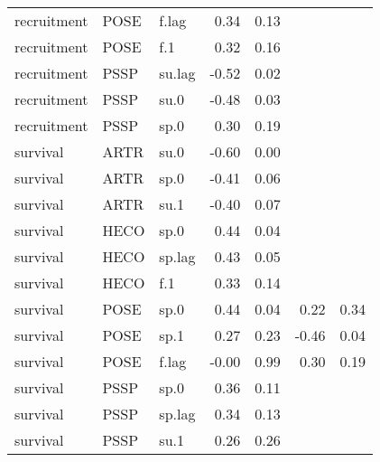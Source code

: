 \begin{table}[ht]
\begin{tabular}{lllrrrr}
  recruitment & POSE & f.lag & 0.34 & 0.13 &  &  \\ 
  recruitment & POSE & f.1 & 0.32 & 0.16 &  &  \\ 
  recruitment & PSSP & su.lag & -0.52 & 0.02 &  &  \\ 
  recruitment & PSSP & su.0 & -0.48 & 0.03 &  &  \\ 
  recruitment & PSSP & sp.0 & 0.30 & 0.19 &  &  \\ 
  survival & ARTR & su.0 & -0.60 & 0.00 &  &  \\ 
  survival & ARTR & sp.0 & -0.41 & 0.06 &  &  \\ 
  survival & ARTR & su.1 & -0.40 & 0.07 &  &  \\ 
  survival & HECO & sp.0 & 0.44 & 0.04 &  &  \\ 
  survival & HECO & sp.lag & 0.43 & 0.05 &  &  \\ 
  survival & HECO & f.1 & 0.33 & 0.14 &  &  \\ 
  survival & POSE & sp.0 & 0.44 & 0.04 & 0.22 & 0.34 \\ 
  survival & POSE & sp.1 & 0.27 & 0.23 & -0.46 & 0.04 \\ 
  survival & POSE & f.lag & -0.00 & 0.99 & 0.30 & 0.19 \\ 
  survival & PSSP & sp.0 & 0.36 & 0.11 &  &  \\ 
  survival & PSSP & sp.lag & 0.34 & 0.13 &  &  \\ 
  survival & PSSP & su.1 & 0.26 & 0.26 &  &  \\ 
   \hline
\end{tabular}
\end{table}
